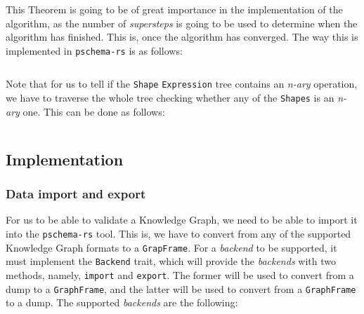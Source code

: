 This Theorem is going to be of great importance in the implementation of the algorithm, as the number of \textit{supersteps} is going to be used to determine when the algorithm has finished. This is, once the algorithm has converged. The way this is implemented in \texttt{pschema-rs} is as follows:

\begin{code}
    \inputminted{rust}{code/listings/11-8_iterations.rs}
\end{code}

Note that for us to tell if the \texttt{Shape} \texttt{Expression} tree contains an \textit{n-ary} operation, we have to traverse the whole tree checking whether any of the \texttt{Shapes} is an \textit{n-ary} one. This can be done as follows:

\begin{code}
    \inputminted{rust}{code/listings/11-8_nary.rs}
\end{code}

\subsection{Implementation}

\subsubsection{Data import and export}

For us to be able to validate a Knowledge Graph, we need to be able to import it into the \texttt{pschema-rs} tool. This is, we have to convert from any of the supported Knowledge Graph formats to a \texttt{GrapFrame}. For a \textit{backend} to be supported, it must implement the \texttt{Backend} trait, which will provide the \textit{backends} with two methods, namely, \texttt{import} and \texttt{export}. The former will be used to convert from a dump to a \texttt{GraphFrame}, and the latter will be used to convert from a \texttt{GraphFrame} to a dump. The supported \textit{backends} are the following:

